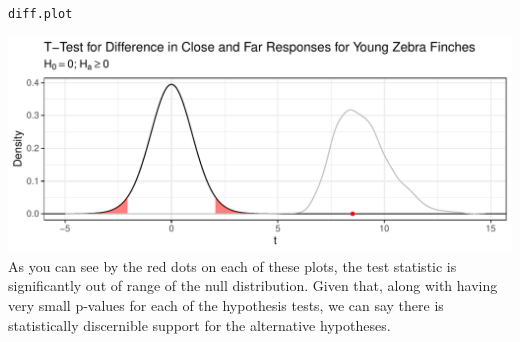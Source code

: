 \documentclass{article}\usepackage[]{graphicx}\usepackage[]{xcolor}
\makeatletter
\def\maxwidth{ %
  \ifdim\Gin@nat@width>\linewidth
    \linewidth
  \else
    \Gin@nat@width
  \fi
}
\newcommand{\hldef}[1]{\textcolor[rgb]{0.345,0.345,0.345}{#1}}%
\newenvironment{kframe}{%
 \def\at@end@of@kframe{}%
 \ifinner\ifhmode%
  \def\at@end@of@kframe{\end{minipage}}%
  \begin{minipage}{\columnwidth}%
 \fi\fi%
 \def\FrameCommand##1{\hskip\@totalleftmargin \hskip-\fboxsep
 \colorbox{shadecolor}{##1}\hskip-\fboxsep
     \hskip-\linewidth \hskip-\@totalleftmargin \hskip\columnwidth}%
 \MakeFramed {\advance\hsize-\width
   \@totalleftmargin\z@ \linewidth\hsize
   \@setminipage}}%
 {\par\unskip\endMakeFramed%
 \at@end@of@kframe}
\newenvironment{knitrout}{}{} %
\makeatother
\begin{document}
\begin{enumerate}
\begin{enumerate}
\begin{knitrout}
\begin{kframe}
\begin{alltt}
\hldef{diff.plot}
\end{alltt}
\end{kframe}
\includegraphics[width=\maxwidth]{figure/unnamed-chunk-10-1} 
\end{knitrout}
As you can see by the red dots on each of these plots, the test statistic is significantly out of range of the null distribution. Given that, along with having very small p-values for each of the hypothesis tests, we can say there is statistically discernible support for the alternative hypotheses.
\end{enumerate}
\end{enumerate}



\end{document}
